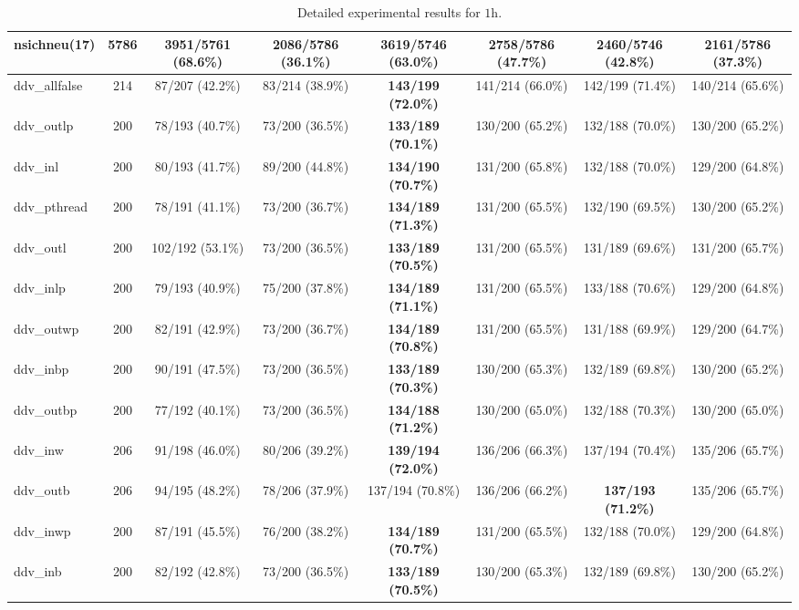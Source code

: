 \begin{landscape}
\begin{table}[h]
{\begin{tabular}[a]{|lc||c|c||c|c||c|c|}
nsichneu(17)      & 5786 & \textbf{3951/5761 (68.6\%)} & 2086/5786 (36.1\%) & 3619/5746 (63.0\%) & 2758/5786 (47.7\%) &  2460/5746 (42.8\%) & 2161/5786 (37.3\%)  \\
\hline
ddv\_allfalse  &  214 &   87/207  (42.2\%) &   83/214  (38.9\%) & \textbf{ 143/199  (72.0\%)} &  141/214  (66.0\%) &    142/199  (71.4\%) &  140/214  (65.6\%)  \\
ddv\_outlp     &  200 &   78/193  (40.7\%) &   73/200  (36.5\%) & \textbf{ 133/189  (70.1\%)} &  130/200  (65.2\%) &    132/188  (70.0\%) &  130/200  (65.2\%)  \\
ddv\_inl       &  200 &   80/193  (41.7\%) &   89/200  (44.8\%) & \textbf{ 134/190  (70.7\%)} &  131/200  (65.8\%) &    132/188  (70.0\%) &  129/200  (64.8\%)  \\
ddv\_pthread   &  200 &   78/191  (41.1\%) &   73/200  (36.7\%) & \textbf{ 134/189  (71.3\%)} &  131/200  (65.5\%) &    132/190  (69.5\%) &  130/200  (65.2\%)  \\
ddv\_outl      &  200 &  102/192  (53.1\%) &   73/200  (36.5\%) & \textbf{ 133/189  (70.5\%)} &  131/200  (65.5\%) &    131/189  (69.6\%) &  131/200  (65.7\%)  \\
ddv\_inlp      &  200 &   79/193  (40.9\%) &   75/200  (37.8\%) & \textbf{ 134/189  (71.1\%)} &  131/200  (65.5\%) &    133/188  (70.6\%) &  129/200  (64.8\%)  \\
ddv\_outwp     &  200 &   82/191  (42.9\%) &   73/200  (36.7\%) & \textbf{ 134/189  (70.8\%)} &  131/200  (65.5\%) &    131/188  (69.9\%) &  129/200  (64.7\%)  \\
ddv\_inbp      &  200 &   90/191  (47.5\%) &   73/200  (36.5\%) & \textbf{ 133/189  (70.3\%)} &  130/200  (65.3\%) &    132/189  (69.8\%) &  130/200  (65.2\%)  \\
ddv\_outbp     &  200 &   77/192  (40.1\%) &   73/200  (36.5\%) & \textbf{ 134/188  (71.2\%)} &  130/200  (65.0\%) &    132/188  (70.3\%) &  130/200  (65.0\%)  \\
ddv\_inw       &  206 &   91/198  (46.0\%) &   80/206  (39.2\%) & \textbf{ 139/194  (72.0\%)} &  136/206  (66.3\%) &    137/194  (70.4\%) &  135/206  (65.7\%)  \\
ddv\_outb      &  206 &   94/195  (48.2\%) &   78/206  (37.9\%) &  137/194  (70.8\%) &  136/206  (66.2\%) &   \textbf{ 137/193  (71.2\%)} &  135/206  (65.7\%)  \\
ddv\_inwp      &  200 &   87/191  (45.5\%) &   76/200  (38.2\%) & \textbf{ 134/189  (70.7\%)} &  131/200  (65.5\%) &    132/188  (70.0\%) &  129/200  (64.8\%)  \\
ddv\_inb       &  200 &   82/192  (42.8\%) &   73/200  (36.5\%) & \textbf{ 133/189  (70.5\%)} &  130/200  (65.3\%) &    132/189  (69.8\%) &  130/200  (65.2\%)  \\

\hline
  \end{tabular}}
  \caption{Detailed experimental results for  $1$h.}
  \label{tab:exp1h_d}
\end{table}
\end{landscape}





